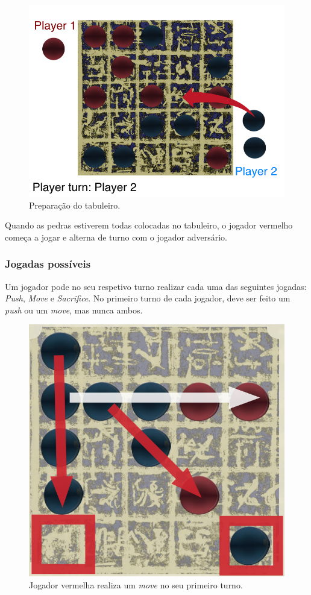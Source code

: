 \documentclass[a4paper]{article}
\begin{document}
\begin{figure}[!htb]
	\centering
	\includegraphics[scale=0.3]{board_prep.png}
	\caption{Preparação do tabuleiro.}
\end{figure}

Quando as pedras estiverem todas colocadas no tabuleiro, o jogador vermelho começa a jogar e alterna de turno com o jogador adversário.

\subsubsection{Jogadas possíveis}

Um jogador pode no seu respetivo turno realizar cada uma das seguintes jogadas: \textit{Push}, \textit{Move} e \textit{Sacrifice}.
No primeiro turno de cada jogador, deve ser feito um \textit{push} ou um \textit{move}, mas nunca ambos.

\begin{figure}[!htb]
	\centering
	\includegraphics[scale=0.3]{push2.png}
	\caption{Jogador vermelha realiza um \textit{move} no seu primeiro turno.}
\end{figure}
\end{document}
